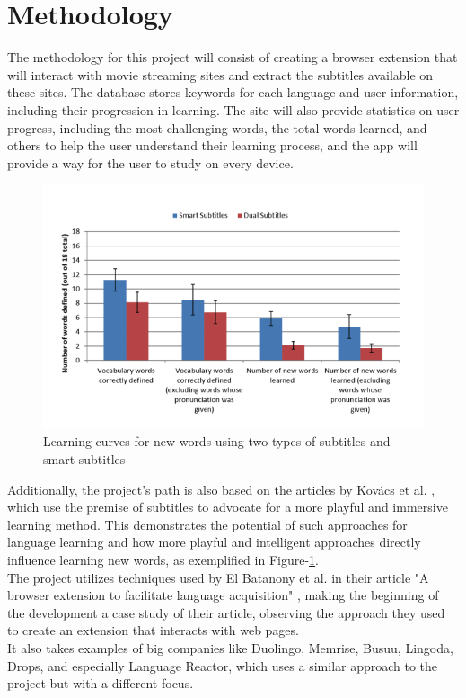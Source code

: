 \documentclass[12pt]{article}
\begin{document}
\section{Methodology}
The methodology for this project will consist of creating a browser extension that will interact with movie streaming sites and extract the subtitles available on these sites. The database stores keywords for each language and user information, including their progression in learning. The site will also provide statistics on user progress, including the most challenging words, the total words learned, and others to help the user understand their learning process, and the app will provide a way for the user to study on every device. \\
\begin{figure}[h]
\centering
\caption{Learning curves for new words using two types of subtitles and smart subtitles}
\label{fig:my_label}
\includegraphics[width=1\textwidth]{assets/3.png}
\end{figure} 
Additionally, the project's path is also based on the articles by Kovács et al. \cite{Kovacs14}, which use the premise of subtitles to advocate for a more playful and immersive learning method. This demonstrates the potential of such approaches for language learning and how more playful and intelligent approaches directly influence learning new words, as exemplified in Figure-\ref{fig:my_label}. \\
The project utilizes techniques used by El Batanony et al. in their article "A browser extension to facilitate language acquisition" \cite{ElBatanony21}, making the beginning of the development a case study of their article, observing the approach they used to create an extension that interacts with web pages.  \\
It also takes examples of big companies like Duolingo, Memrise, Busuu, Lingoda, Drops, and especially Language Reactor, which uses a similar approach to the project but with a different focus.  \\
\end{document}
